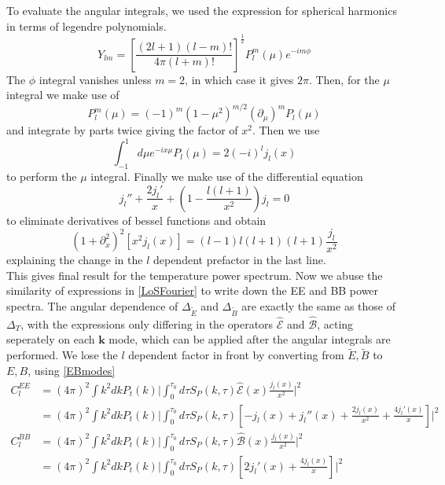 \documentclass[a4paper,10pt]{article}
\renewcommand{\v}[1]{\mathbf{#1}}
\newcommand{\half}{\frac{1}{2}}
\begin{document}
To evaluate the angular integrals, we used the expression for spherical harmonics in terms of legendre polynomials.
\begin{equation}
Y_{lm} = \left[\frac{(2l+1)(l-m)!}{4\pi(l+m)!}\right]^\half P_l^m(\mu)e^{-im\phi}
\end{equation}
The $\phi$ integral vanishes unless $m=2$, in which case it gives $2\pi$. Then, for the $\mu$ integral we make use of 
\begin{equation}
P^m_l(\mu)=(-1)^m(1-\mu^2)^{m/2}(\partial_\mu)^mP_l(\mu)
\end{equation}
and integrate by parts twice giving the factor of $x^2$. Then we use 
\begin{equation}
\int_{-1}^1 d\mu e^{-ix\mu}P_l(\mu) = 2(-i)^lj_l(x)
\end{equation}
to perform the $\mu$ integral. Finally we make use of the differential equation
\begin{equation}
j_l''+\frac{2j_l'}{x}+\left(1-\frac{l(l+1)}{x^2}\right)j_l=0
\end{equation}
to eliminate derivatives of bessel functions and obtain
\begin{equation}
(1+\partial_x^2)^2[x^2j_l(x)] = (l-1)l(l+1)(l+1)\frac{j_l}{x^2}
\end{equation}
explaining the change in the $l$ dependent prefactor in the last line.\\

This gives final result for the temperature power spectrum. Now we abuse the similarity of expressions in \ref{LoSFourier} to write down the EE and BB power spectra. The angular dependence of $\Delta_{\tilde{E}}$ and $\Delta_{\tilde{B}}$ are exactly the same as those of $\Delta_T$, with the expressions only differing in the operators $\hat{\mathcal{E}}$ and $\hat{\mathcal{B}}$, acting seperately on each $\v{k}$ mode, which can be applied after the angular integrals are performed. We lose the $l$ dependent factor in front by converting from $\tilde{E}, \tilde{B}$ to $E,B$, using \ref{EBmodes}
\begin{equation}\begin{split}
C_l^{EE} &= (4\pi)^2 \int k^2 dk P_t(k) \bigg|  \int_0^{\tau_0}d\tau  S_P(k,\tau)\hat{\mathcal{E}}(x)\frac{j_l(x)}{x^2} \bigg|^2\\
&= (4\pi)^2\int k^2 dk P_t(k) \bigg|  \int_0^{\tau_0}d\tau  S_P(k,\tau)[-j_l(x) +j_l''(x)+\frac{2j_l(x)}{x^2} + \frac{4j_l'(x)}{x}]\bigg|^2\\
C_l^{BB} &= (4\pi)^2 \int k^2 dk P_t(k) \bigg|  \int_0^{\tau_0}d\tau  S_P(k,\tau)\hat{\mathcal{B}}(x)\frac{j_l(x)}{x^2} \bigg|^2\\
&= (4\pi)^2\int k^2 dk P_t(k) \bigg|  \int_0^{\tau_0} d\tau S_P(k,\tau)[2j_l'(x)+\frac{4j_l(x)}{x}]\bigg|^2
\label{primordialBmodes}
\end{split}\end{equation}
\end{document}
